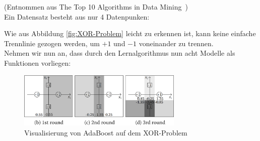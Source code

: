 (Entnommen aus \glqq The Top 10 Algorithms in Data Mining\grqq~\cite{WuKumar2009}) \\[10pt]
Ein Datensatz besteht aus nur 4 Datenpunken:


Wie aus Abbildung \ref*{fig:XOR-Problem} leicht zu erkennen ist, kann keine einfache Trennlinie gezogen werden, um
$+1$ und $-1$ voneinander zu trennen.\\
Nehmen wir nun an, dass durch den Lernalgorithmus nun acht Modelle als Funktionen vorliegen:


\begin{figure}
    \centering
    \includegraphics[width=0.7\textwidth]{figures/XOR_Solution.png}
    \caption[]{Visualisierung von AdaBoost auf dem XOR-Problem}
    \label{fig:XOR-Solution}
\end{figure}